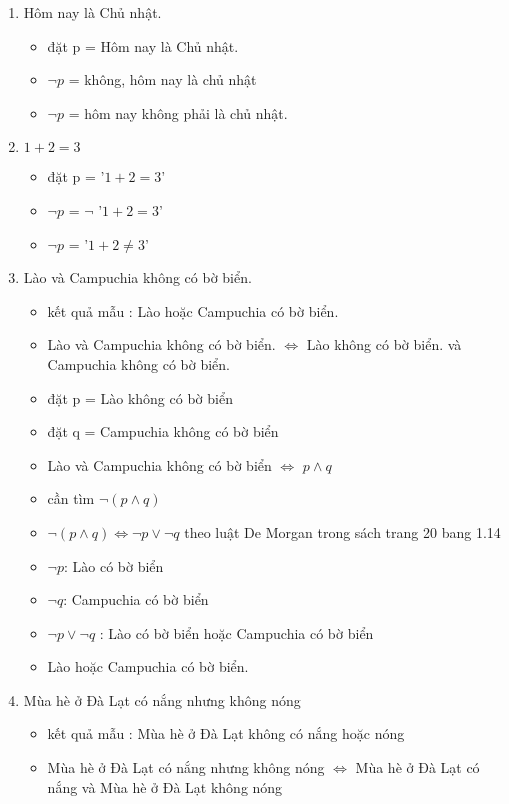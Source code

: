 \documentclass{article}
\begin{document}
\begin{enumerate}
    \item  Hôm nay là Chủ nhật.
    \begin{itemize}
        \item đặt p = Hôm nay là Chủ nhật.
        \item $\neg p$ = không, hôm nay là chủ nhật
        \item $\neg p$ = hôm nay không phải là chủ nhật.
    \end{itemize}
    \item $1 +  2 = 3$
    \begin{itemize}
        \item đặt p = '$1 +  2 = 3$'
        \item $\neg p$ = $\neg$ '$1 +  2 = 3$'
        \item $\neg p$ = '$1 +  2 \neq 3$'
    \end{itemize}
    \item Lào và Campuchia không có bờ biển.
    \begin{itemize}
        \item kết quả mẫu :  Lào hoặc Campuchia có bờ biển.
        \item Lào và Campuchia không có bờ biển. $\Longleftrightarrow$ Lào không có bờ biển. và Campuchia không có bờ biển.
        \item đặt p = Lào không có bờ biển
        \item đặt q = Campuchia không có bờ biển
        \item Lào và Campuchia không có bờ biển $\Longleftrightarrow$ $p \wedge q$
        \item cần tìm $\neg(p \wedge q)$
        \item $\neg(p \wedge q) \Longleftrightarrow \neg p \vee \neg q$ theo luật De Morgan trong sách trang 20 bang 1.14
        \item $\neg p$: Lào có bờ biển
        \item $\neg q$: Campuchia  có bờ biển
        \item $\neg p \vee \neg q$ : Lào có bờ biển hoặc Campuchia  có bờ biển
        \item Lào hoặc Campuchia có bờ biển.
    \end{itemize}
    \item Mùa hè ở Đà Lạt có nắng nhưng không nóng
    \begin{itemize}
        \item kết quả mẫu :  Mùa hè ở Đà Lạt không có nắng hoặc nóng
        \item Mùa hè ở Đà Lạt có nắng nhưng không nóng $\Longleftrightarrow$ Mùa hè ở Đà Lạt có nắng và Mùa hè ở Đà Lạt không nóng

\end{itemize}
\end{enumerate}
\end{document}

